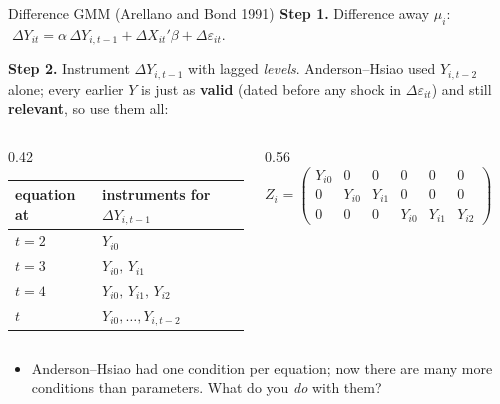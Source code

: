 \documentclass[
  11pt,
  ignorenonframetext,
  aspectratio=169,
]{beamer}
\providecommand{\tightlist}{%
  \setlength{\itemsep}{0pt}\setlength{\parskip}{0pt}}
\begin{document}
\begin{frame}{Difference GMM (Arellano and Bond 1991)}
\protect{}\label{difference-gmm-arellano-and-bond-1991}
\textbf{Step 1.} Difference away \(\mu_i\):
\(\;\Delta Y_{it} = \alpha\,\Delta Y_{i,t-1} + \Delta X_{it}'\beta + \Delta\varepsilon_{it}\).

\textbf{Step 2.} Instrument \(\Delta Y_{i,t-1}\) with lagged
\emph{levels}. Anderson--Hsiao used \(Y_{i,t-2}\) alone; every earlier
\(Y\) is just as \textbf{valid} (dated before any shock in
\(\Delta\varepsilon_{it}\)) and still \textbf{relevant}, so use them
all:

\begin{columns}[T]
\begin{column}{0.42\linewidth}
\begin{center}\small
\begin{tabular}{ll}
\toprule
equation at & instruments for $\Delta Y_{i,t-1}$ \\
\midrule
$t = 2$ & $Y_{i0}$ \\
$t = 3$ & $Y_{i0},\, Y_{i1}$ \\
$t = 4$ & $Y_{i0},\, Y_{i1},\, Y_{i2}$ \\
$t$ & $Y_{i0}, \dots, Y_{i,t-2}$ \\
\bottomrule
\end{tabular}
\end{center}
\end{column}

\begin{column}{0.56\linewidth}
\[
Z_i = \begin{pmatrix}
Y_{i0} & 0 & 0 & 0 & 0 & 0 \\
0 & Y_{i0} & Y_{i1} & 0 & 0 & 0 \\
0 & 0 & 0 & Y_{i0} & Y_{i1} & Y_{i2}
\end{pmatrix}
\quad
\begin{matrix} t = 2 \\ t = 3 \\ t = 4 \end{matrix}
\]
\end{column}
\end{columns}

\begin{itemize}
\tightlist
\item
  Anderson--Hsiao had one condition per equation; now there are many
  more conditions than parameters. What do you \emph{do} with them?
\end{itemize}
\end{frame}
\end{document}
